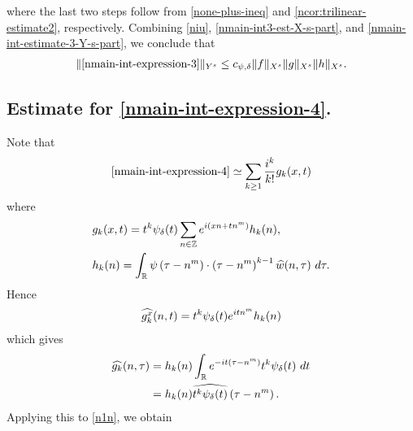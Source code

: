 %
%
where the last two steps follow from \eqref{none-plus-ineq} and
\cref{ncor:trilinear-estimate2}, respectively. Combining \eqref{niu},
\eqref{nmain-int3-est-X-s-part}, and \eqref{nmain-int-estimate-3-Y-s-part}, we
conclude that
%
%
\begin{equation}
	\label{nmain-int3-est}
	\begin{split}
		\|\eqref{nmain-int-expression-3}\|_{Y^s} 
    \le c_{\psi, \delta} \|f\|_{X^s} \|g\|_{X^s} \|h\|_{X^s}.
	\end{split}
\end{equation}
%
%
%
\subsection{Estimate for \eqref{nmain-int-expression-4}.}
Note that
%
%
\begin{equation}
	\label{n1n}
	\begin{split}
		\eqref{nmain-int-expression-4} \simeq \sum_{k \ge 1}
		\frac{i^k}{k!}g_k(x,t)
	\end{split}
\end{equation}
%
%
where 
%
%
\begin{equation*}
	\begin{split}
		& g_k(x,t) = t^k \psi_{\delta}(t) \sum_{n \in \mathbb{Z}} e^{i\left( xn + tn^{m}
		\right)} h_k(n),
		\\
		& h_k(n) = \int_{\mathbb{R}} \psi \left( \tau - n^{m } \right) \cdot \left(
		\tau - n^{m } \right)^{k -1} \widehat{w}(n, \tau) \ d \tau.
	\end{split}
\end{equation*}
%
%
Hence
%
%
\begin{equation*}
	\begin{split}
		\widehat{g_k^x}(n, t) = t^{k} \psi_{\delta}(t) e^{i t n^{m }} h_k(n)
	\end{split}
\end{equation*}
%
%
which gives
%
%
\begin{equation*}
	\begin{split}
		\widehat{g_k}(n, \tau)
		& = h_k(n) \int_{\mathbb{R}} e^{-it\left( \tau - n^{m } \right)}
		t^{k}\psi_{\delta}(t) \ dt
		\\
		& = h_k(n) \widehat{t^{k}\psi_{\delta}(t)} \left( \tau - n^{m } \right).
	\end{split}
\end{equation*}
%
%
Applying this to \eqref{n1n}, we obtain
%
%
